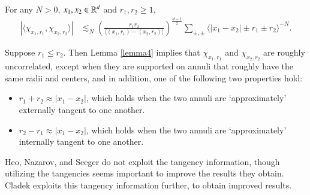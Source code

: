 %
%
%
%

\begin{lemma} \label{lemma4}
    For any $N > 0$, $x_1,x_2 \in \operatorname{\mathbb{R}}^d$ and $r_1,r_2 \geq 1$,
    \begin{align*}
        |\langle \chi_{x_1,r_1}, \chi_{x_2,r_2} \rangle| &\lesssim_N \left( \frac{r_1r_2}{\langle (x_1,r_1) - (x_2,r_2) \rangle} \right)^{\frac{d-1}{2}} \sum\nolimits_{\pm,\pm} \langle |x_1 - x_2| \pm r_1 \pm r_2 \rangle^{-N}.
    \end{align*}
\end{lemma}

\begin{remark}
    Suppose $r_1 \leq r_2$. Then Lemma \ref{lemma4} implies that $\chi_{x_1,r_1}$ and $\chi_{x_2,r_2}$ are roughly uncorrelated, except when they are supported on annuli that roughly have the same radii and centers, and in addition, one of the following two properties hold:
    \begin{itemize}
        \item $r_1 + r_2 \approx |x_1 - x_2|$, which holds when the two annuli are `approximately' externally tangent to one another.

        \item $r_2 - r_1 \approx |x_1 - x_2|$, which holds when the two annuli are `approximately' internally tangent to one another.
    \end{itemize}
    Heo, Nazarov, and Seeger do not exploit the tangency information, though utilizing the tangencies seems important to improve the results they obtain. Cladek exploits this tangency information further, to obtain improved results.
\end{remark}


